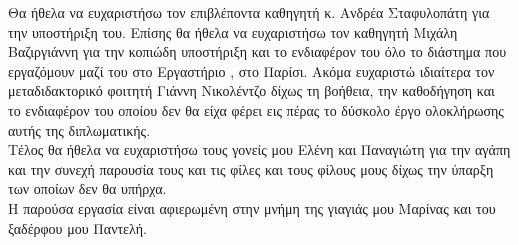 \begin{acknowledgements}
Θα ήθελα να ευχαριστήσω τον επιβλέποντα καθηγητή κ. Ανδρέα Σταφυλοπάτη για την υποστήριξη του.
Επίσης θα ήθελα να ευχαριστήσω τον καθηγητή Μιχάλη Βαζιργιάννη για την κοπιώδη υποστήριξη και το ενδιαφέρον του όλο το διάστημα που εργαζόμουν μαζί του στο Εργαστήριο , στο Παρίσι. 
Ακόμα ευχαριστώ ιδιαίτερα τον μεταδιδακτορικό φοιτητή Γιάννη Νικολέντζο δίχως τη βοήθεια, την καθοδήγηση και το ενδιαφέρον του οποίου δεν θα είχα φέρει εις πέρας το δύσκολο έργο ολοκλήρωσης αυτής της διπλωματικής.\\
Τέλος θα ήθελα να ευχαριστήσω τους γονείς μου Ελένη και Παναγιώτη για την αγάπη και την συνεχή παρουσία τους και τις φίλες και τους φίλους μους δίχως την ύπαρξη των οποίων δεν θα υπήρχα.\\
Η παρούσα εργασία είναι αφιερωμένη στην μνήμη της γιαγιάς μου Μαρίνας και του ξαδέρφου μου Παντελή.
\end{acknowledgements}

